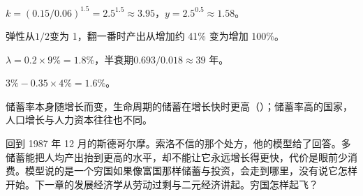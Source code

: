\begin{answers}
\item $k=(0.15/0.06)^{1.5}=2.5^{1.5}\approx3.95$，$y=2.5^{0.5}\approx1.58$。
\item 弹性从$1/2$变为 1，翻一番时产出从增加约 41\% 变为增加 100\%。
\item $\lambda=0.2\times9\%=1.8\%$，半衰期$0.693/0.018\approx39$ 年。
\item $3\%-0.35\times4\%=1.6\%$。
\item 储蓄率本身随增长而变，生命周期的储蓄在增长快时更高（）；储蓄率高的国家，人口增长与人力资本往往也不同。
\end{answers}

回到 1987 年 12 月的斯德哥尔摩。索洛不信的那个处方，他的模型给了回答。多储蓄能把人均产出抬到更高的水平，却不能让它永远增长得更快，代价是眼前少消费。模型说的是一个穷国如果像富国那样储蓄与投资，会走到哪里，没有说它怎样开始。下一章的发展经济学从劳动过剩与二元经济讲起。穷国怎样起飞？
